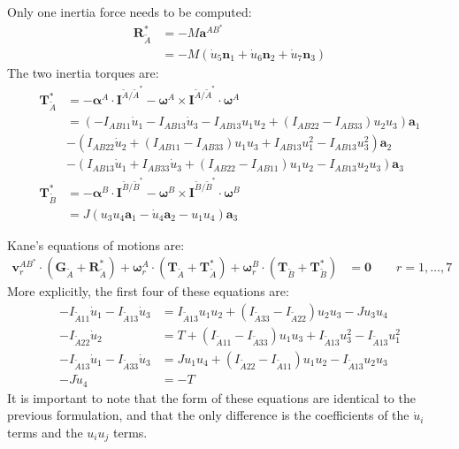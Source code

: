 \documentclass[letterpaper,11pt]{article}
\newcommand{\bs}[1]{ \boldsymbol{ #1 } }
\begin{document}
Only one inertia force needs to be computed:
\begin{align*}
  \bs{R}^*_{\tilde{A}} & = -M\bs{a}^{AB^*}\\
  & = -M\left(\dot{u}_5 \bs{n}_1 + \dot{u}_6 \bs{n}_2 + \dot{u}_7
  \bs{n}_3\right)
\end{align*}
The two inertia torques are:
\begin{align*}
  \bs{T}^*_{\tilde{A}} & = - \bs{\alpha}^A \cdot \bs{I}^{\tilde{A}/\tilde{A}^*}
  - \bs{\omega}^A \times \bs{I}^{\tilde{A}/\tilde{A}^*} \cdot \bs{\omega}^A
  \\
  & = 
  (-I_{AB11}\dot{u}_1 - I_{AB13}\dot{u}_3 - I_{AB13}u_1u_2 + (I_{AB22} - I_{AB33})u_2u_3 )\bs{a}_1 
  \\
  & - (I_{AB22}\dot{u}_2 + (I_{AB11} - I_{AB33})u_1u_3 + I_{AB13}u_1^2 - I_{AB13}u_3^2)\bs{a}_2
  \\
  & - (I_{AB13}\dot{u}_1 + I_{AB33}\dot{u}_3 + (I_{AB22} - I_{AB11})u_1u_2 - I_{AB13}u_2u_3)\bs{a}_3
  \\
  \bs{T}^*_{\tilde{B}} & = -\bs{\alpha}^B \cdot \bs{I}^{\tilde{B}/\tilde{B}^*}
  - \bs{\omega}^B \times \bs{I}^{\tilde{B}/\tilde{B}^*} \cdot \bs{\omega}^B \\
  & = J(u_3u_4\bs{a}_1 - \dot{u}_4\bs{a}_2 - u_1u_4)\bs{a}_3
\end{align*}

Kane's equations of motions are:
\begin{align*}
  \bs{v}^{AB^*}_r \cdot (\bs{G}_{\tilde{A}} + \bs{R}^*_{\tilde{A}}) +
  \bs{\omega}^A_r \cdot (\bs{T}_{\tilde{A}} + \bs{T}^*_{\tilde{A}}) +
  \bs{\omega}^B_r \cdot (\bs{T}_{\tilde{B}} + \bs{T}^*_{\tilde{B}}) & = \bs{0} \qquad r = 1,\dots,7
\end{align*}
More explicitly, the first four of these equations are:
\begin{align*}
  -I_{\tilde{A}11}\dot{u}_1 - I_{\tilde{A}13}\dot{u}_3 &= I_{\tilde{A}13}u_1u_2 + (I_{\tilde{A}33} - I_{\tilde{A}22})u_2u_3 - Ju_3u_4
  \\
  -I_{\tilde{A}22}\dot{u}_2 &=  T + (I_{\tilde{A}11} - I_{\tilde{A}33})u_1u_3 +
  I_{\tilde{A}13}u_3^2 - I_{\tilde{A}13}u_1^2
 \\
 -I_{\tilde{A}13}\dot{u}_1 - I_{\tilde{A}33}\dot{u}_3 & =  Ju_1u_4 +
 (I_{\tilde{A}22} - I_{\tilde{A}11})u_1u_2 - I_{\tilde{A}13}u_2u_3
 \\
 -J\dot{u}_4 &= -T
\end{align*}
It is important to note that the form of these equations are identical to the
previous formulation, and that the only difference is the coefficients of the
$\dot{u}_i$ terms and the $u_iu_j$ terms.
\end{document}
